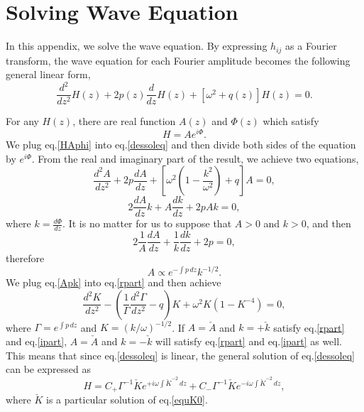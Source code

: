 \documentclass[
    jor,
    amsmath,amssymb,preprint,
    superscriptaddress,
]{revtex4-2}
\begin{document}
\appendix

\section{Solving Wave Equation}\label{sec:appa}

In this appendix, we solve the wave equation. By expressing $h_{ij}$ as a Fourier transform, the
wave equation for each Fourier amplitude becomes the following general linear form,
\begin{equation}
    \frac{d^2}{d z^2}H(z)+2p(z)\frac{d}{d z}H(z)+\left[\omega^2+q(z)\right]H(z)=0.\label{dessoleq}
\end{equation}

For any $H(z)$, there are real function $A(z)$ and $\Phi(z)$ which satisfy
\begin{equation}\label{HAphi}
    H=Ae^{i\Phi}.
\end{equation}
We plug eq.\eqref{HAphi} into eq.\eqref{dessoleq} and then divide both sides of the equation by $e^{i\Phi}$. From the real and imaginary part of the result, we achieve two equations,
\begin{equation}\label{rpart}
    \frac{d^2 A}{d z^2}+2p\frac{d A}{d z}+\left[\omega^2\left(1-\frac{k^2}{\omega^2}\right)+q\right]A=0,
\end{equation}
\begin{equation}\label{ipart}
    2\frac{d A}{d z}k+A\frac{d k}{d z}+2pAk=0,
\end{equation}
where $k=\frac{d \Phi}{d z}$. It is no matter for us to suppose that $A>0$ and $k>0$, and then
\begin{equation}
    2\frac{1}{A}\frac{d A}{d z}+\frac{1}{k}\frac{d k}{d z}+2p=0,
\end{equation}
therefore
\begin{equation}\label{Apk}
    A\propto e^{-\int p\,dz}k^{-1/2}.
\end{equation}
We plug eq.\eqref{Apk} into eq.\eqref{rpart} and then achieve
\begin{equation}\label{equK0}
    \frac{d^2 K}{d z^2}-\left(\frac{1}{\Gamma}\frac{d^2\Gamma}{d z^2}-q\right)K+\omega^2K(1-K^{-4})=0,
\end{equation}
where $\Gamma=e^{\int p \,dz}$ and $K=(k/\omega)^{-1/2}$. If $A=\check{A}$ and $k=+\check{k}$ satisfy eq.\eqref{rpart} and eq.\eqref{ipart}, $A=\check{A}$ and $k=-\check{k}$ will satisfy eq.\eqref{rpart} and eq.\eqref{ipart} as well. This means that since eq.\eqref{dessoleq} is linear, the general solution of eq.\eqref{dessoleq} can be expressed as
\begin{equation}\label{solution}
    H=C_+\Gamma^{-1}\check{K}e^{+i\omega\int  \check{K}^{-2}\,d z}+C_-\Gamma^{-1}\check{K}e^{-i\omega\int  \check{K}^{-2}\,d z},
\end{equation}
where $\check{K}$ is a particular solution of eq.\eqref{equK0}.
\end{document}
